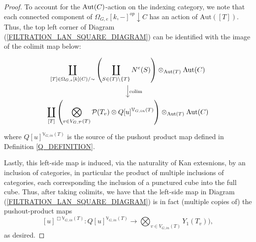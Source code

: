 \documentclass[a4paper,10pt]{article}%
\begin{document}
\begin{proof}
To account for the $\operatorname{Aut}(C)$-action on the indexing category, we note that each connected component of $\Omega_{G,e}[k,-]^{op}\downarrow C$ has an action of $\mathrm{Aut}([T])$. Thus, the top left corner of Diagram (\ref{FILTRATION_LAN_SQUARE_DIAGRAM}) can be identified with the image of the colimit map below:
\[
\begin{tikzcd}
\displaystyle\coprod_{[T]\in \Omega_{G,e}[k](C)/\sim}\left(\displaystyle\coprod_{S\in (T)\setminus{\set{T}}}N^e(S)\right) \otimes_{\mathrm{Aut}(T)}\Aut(C) \arrow[d, "\colim"]\\
\displaystyle\coprod_{[T]}\left( \bigotimes_{v\in V_{G,\P}(T)} \P(T_v) \otimes Q[u]^{\mathbb V_{G,in}(T)}\right) \otimes_{\mathrm{Aut}(T)}\Aut(C)
\end{tikzcd}
\]
where $Q[u]^{\mathbb V_{G,in}(T)}$ is the source of the pushout product map defined in Definition \ref{Q_DEFINITION}.

Lastly, this left-side map is induced, via the naturality of Kan extesnions, by an inclusion of categories, in particular the product of multiple inclusions of categories, each corresponding the inclusion of a punctured cube into the full cube. Thus, after taking colimits, we have that the left-side map in Diagram (\ref{FILTRATION_LAN_SQUARE_DIAGRAM}) is in fact (multiple copies of) the pushout-product maps 
\[
[u]^{\Box \mathbb V_{G,in}(T)}: Q[u]^{\mathbb V_{G,in}(T)} \to \bigotimes_{v\in V_{G,in}(T)}Y_1(T_v)),
\]
as desired.
\end{proof}










{}




\end{document}
